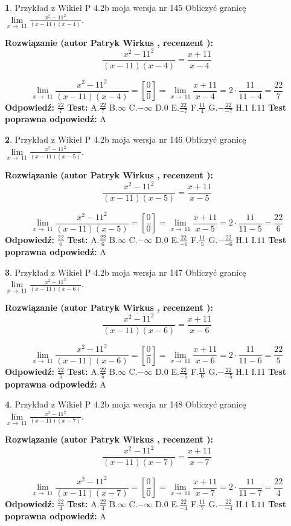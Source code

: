 \documentclass[12pt, a4paper]{article}
\theoremstyle{definition} %
\newtheorem{zad}{}
\newcommand{\zadStart}[1]{\begin{zad}#1\newline}
\newcommand{\zadStop}{\end{zad}}
\newcommand{\rozwStart}[2]{\noindent \textbf{Rozwiązanie (autor #1 , recenzent #2): }\newline}
\newcommand{\rozwStop}{\newline}
\newcommand{\odpStart}{\noindent \textbf{Odpowiedź:}\newline}
\newcommand{\odpStop}{\newline}
\newcommand{\testStart}{\noindent \textbf{Test:}\newline}
\newcommand{\testStop}{\newline}
\newcommand{\kluczStart}{\noindent \textbf{Test poprawna odpowiedź:}\newline}
\newcommand{\kluczStop}{\newline}
\begin{document}
\zadStart{Przykład z Wikieł P 4.2b moja wersja nr 145}
Obliczyć granicę $\lim\limits_{x\to\ 11}\frac{x^{2}-11^{2}}{(x-11)(x-4)}$.
\zadStop
\rozwStart{Patryk Wirkus}{}
$$\frac{x^{2}-11^{2}}{(x-11)(x-4)}=\frac{x+11}{x-4}$$

$$\lim\limits_{x\to\ 11}\frac{x^{2}-11^{2}}{(x-11)(x-4)}=[\frac{0}{0}]=\lim\limits_{x\to\ 11}\frac{x+11}{x-4}=2 \cdot \frac{11}{11-4} = \frac{22}{7}$$
\rozwStop
\odpStart
$\frac{22}{7}$
\odpStop
\testStart
A.$\frac{22}{7}$
B.$\infty$
C.$-\infty$
D.$0$
E.$\frac{22}{-7}$
F.$\frac{11}{4}$
G.$-\frac{22}{-7}$
H.$1$
I.$11$
\testStop
\kluczStart
A
\kluczStop



\zadStart{Przykład z Wikieł P 4.2b moja wersja nr 146}
Obliczyć granicę $\lim\limits_{x\to\ 11}\frac{x^{2}-11^{2}}{(x-11)(x-5)}$.
\zadStop
\rozwStart{Patryk Wirkus}{}
$$\frac{x^{2}-11^{2}}{(x-11)(x-5)}=\frac{x+11}{x-5}$$

$$\lim\limits_{x\to\ 11}\frac{x^{2}-11^{2}}{(x-11)(x-5)}=[\frac{0}{0}]=\lim\limits_{x\to\ 11}\frac{x+11}{x-5}=2 \cdot \frac{11}{11-5} = \frac{22}{6}$$
\rozwStop
\odpStart
$\frac{22}{6}$
\odpStop
\testStart
A.$\frac{22}{6}$
B.$\infty$
C.$-\infty$
D.$0$
E.$\frac{22}{-6}$
F.$\frac{11}{5}$
G.$-\frac{22}{-6}$
H.$1$
I.$11$
\testStop
\kluczStart
A
\kluczStop



\zadStart{Przykład z Wikieł P 4.2b moja wersja nr 147}
Obliczyć granicę $\lim\limits_{x\to\ 11}\frac{x^{2}-11^{2}}{(x-11)(x-6)}$.
\zadStop
\rozwStart{Patryk Wirkus}{}
$$\frac{x^{2}-11^{2}}{(x-11)(x-6)}=\frac{x+11}{x-6}$$

$$\lim\limits_{x\to\ 11}\frac{x^{2}-11^{2}}{(x-11)(x-6)}=[\frac{0}{0}]=\lim\limits_{x\to\ 11}\frac{x+11}{x-6}=2 \cdot \frac{11}{11-6} = \frac{22}{5}$$
\rozwStop
\odpStart
$\frac{22}{5}$
\odpStop
\testStart
A.$\frac{22}{5}$
B.$\infty$
C.$-\infty$
D.$0$
E.$\frac{22}{-5}$
F.$\frac{11}{6}$
G.$-\frac{22}{-5}$
H.$1$
I.$11$
\testStop
\kluczStart
A
\kluczStop



\zadStart{Przykład z Wikieł P 4.2b moja wersja nr 148}
Obliczyć granicę $\lim\limits_{x\to\ 11}\frac{x^{2}-11^{2}}{(x-11)(x-7)}$.
\zadStop
\rozwStart{Patryk Wirkus}{}
$$\frac{x^{2}-11^{2}}{(x-11)(x-7)}=\frac{x+11}{x-7}$$

$$\lim\limits_{x\to\ 11}\frac{x^{2}-11^{2}}{(x-11)(x-7)}=[\frac{0}{0}]=\lim\limits_{x\to\ 11}\frac{x+11}{x-7}=2 \cdot \frac{11}{11-7} = \frac{22}{4}$$
\rozwStop
\odpStart
$\frac{22}{4}$
\odpStop
\testStart
A.$\frac{22}{4}$
B.$\infty$
C.$-\infty$
D.$0$
E.$\frac{22}{-4}$
F.$\frac{11}{7}$
G.$-\frac{22}{-4}$
H.$1$
I.$11$
\testStop
\kluczStart
A
\kluczStop
\end{document}
